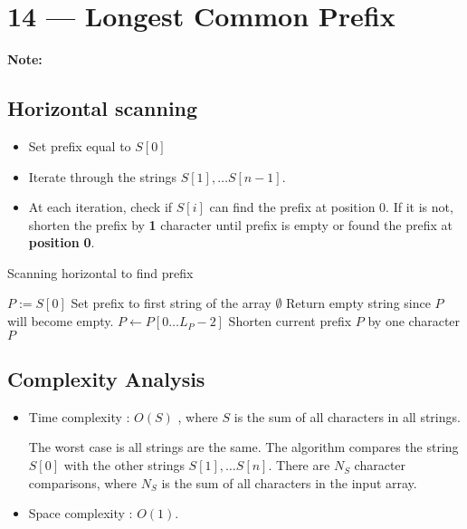 \documentclass[a4paper,12pt]{article}
\begin{document}
\section{14 --- Longest Common Prefix}
\textbf{\large{Note:}}
\subsection{Horizontal scanning}
\begin{itemize}
\item Set prefix equal to $S[0]$
\item Iterate through the strings $S[1],\ldots S[n-1]$.
\item At each iteration, check if $S[i]$ can find the prefix at position 0. If it is not, {\color{red}shorten} the prefix by \textbf{\color{red}1} character until prefix is empty or found the prefix at \textbf{position} \textbf{\color{red}0}.
\end{itemize}
\setcounter{algorithm}{0}
\begin{algorithm}[H]
\caption{Scanning horizontal to find prefix}
\begin{algorithmic}[1]
\Statex
{}
\State $P := S[0]$ \Comment Set prefix to first string of the array
\Return $\emptyset$ \Comment Return empty string since $P$ will become empty.
\EndIf
\State $P\gets P[0\ldots L_{P}-2]$ \Comment Shorten current prefix $P$ by one character
\EndWhile
\EndFor
\State \Return $P$
\EndProcedure
\Statex
\end{algorithmic}
\end{algorithm}
\subsection{Complexity Analysis}
\begin{itemize}
\item Time complexity : $O(S)$ , where $S$ is the sum of all characters in all strings.
\par
The worst case is all strings are the same. The algorithm compares the string $S[0]$ with the other strings $S[1], \ldots S[n]$. There are $N_{S}$ character comparisons, where $N_{S}$ is the sum of all characters in the input array.
\item Space complexity : $O(1)$. 
\end{itemize}
\end{document}
